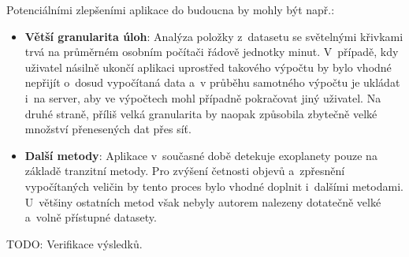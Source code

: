 \documentclass[a4paper,12pt]{article}
\begin{document}
{{{{{{{{{{{{Potenciálními zlepšeními aplikace do budoucna by mohly být např.:

\begin{itemize}
\item \textbf{Větší granularita úloh}: Analýza položky z~datasetu se světelnými křivkami trvá na průměrném osobním počítači řádově jednotky minut. V~případě, kdy uživatel násilně ukončí aplikaci uprostřed takového výpočtu by bylo vhodné nepřijít o~dosud vypočítaná data a~v průběhu samotného výpočtu je ukládat i~na server, aby ve výpočtech mohl případně pokračovat jiný uživatel. Na druhé straně, příliš velká granularita by naopak způsobila zbytečně velké množství přenesených dat přes síť.

\item \textbf{Další metody}: Aplikace v~současné době detekuje exoplanety pouze na základě tranzitní metody. Pro zvýšení četnosti objevů a~zpřesnění vypočítaných veličin by tento proces bylo vhodné doplnit i~dalšími metodami. U~většiny ostatních metod však nebyly autorem nalezeny dotatečně velké a~volně přístupné datasety.
\end{itemize}


TODO: Verifikace výsledků.

\begin{thebibliography}{99}	%






\end{thebibliography}}}}}}}}}}}}}
\end{document}

